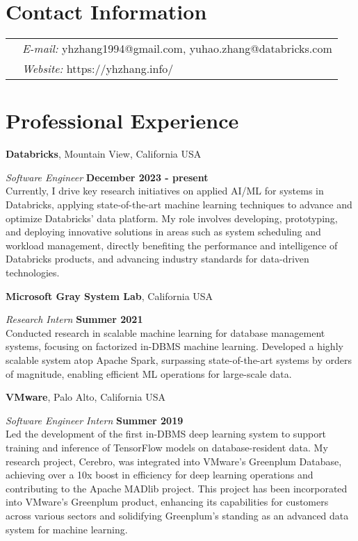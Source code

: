 \documentclass[margin,line]{res}
\begin{document}
\sloppy


\begin{resume}
\section{\sc Contact Information}
\vspace{.05in}
\begin{tabular}{@{}p{2in}p{4in}}
& {\it E-mail:} yhzhang1994@gmail.com, yuhao.zhang@databricks.com\\
& {\it Website:} https://yhzhang.info/ \\     
\end{tabular}

\section{\sc Professional Experience}
{\bf Databricks}, Mountain View, California USA

\vspace{-.3cm}
{\em Software Engineer} \hfill {\bf December 2023 - present}\\
Currently, I drive key research initiatives on applied AI/ML for systems in Databricks, applying state-of-the-art machine learning techniques to advance and optimize Databricks' data platform. My role involves developing, prototyping, and deploying innovative solutions in areas such as system scheduling and workload management, directly benefiting the performance and intelligence of Databricks products, and advancing industry standards for data-driven technologies.

{\bf Microsoft Gray System Lab}, California USA

\vspace{-.3cm}
{\em Research Intern} \hfill {\bf Summer 2021}\\
Conducted research in scalable machine learning for database management systems, focusing on factorized in-DBMS machine learning. Developed a highly scalable system atop Apache Spark, surpassing state-of-the-art systems by orders of magnitude, enabling efficient ML operations for large-scale data.

{\bf VMware}, Palo Alto, California USA

\vspace{-.3cm}
{\em Software Engineer Intern} \hfill {\bf Summer 2019}\\
Led the development of the first in-DBMS deep learning system to support training and inference of TensorFlow models on database-resident data. My research project, Cerebro, was integrated into VMware's Greenplum Database, achieving over a 10x boost in efficiency for deep learning operations and contributing to the Apache MADlib project. This project has been incorporated into VMware's Greenplum product, enhancing its capabilities for customers across various sectors and solidifying Greenplum's standing as an advanced data system for machine learning.


\end{resume}
\end{document}

